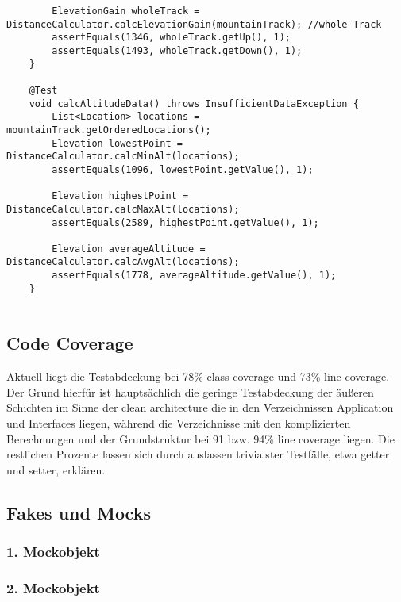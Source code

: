 \begin{lstlisting}
        ElevationGain wholeTrack = DistanceCalculator.calcElevationGain(mountainTrack); //whole Track
        assertEquals(1346, wholeTrack.getUp(), 1);
        assertEquals(1493, wholeTrack.getDown(), 1);
    }

    @Test
    void calcAltitudeData() throws InsufficientDataException {
        List<Location> locations = mountainTrack.getOrderedLocations();
        Elevation lowestPoint = DistanceCalculator.calcMinAlt(locations);
        assertEquals(1096, lowestPoint.getValue(), 1);

        Elevation highestPoint = DistanceCalculator.calcMaxAlt(locations);
        assertEquals(2589, highestPoint.getValue(), 1);

        Elevation averageAltitude = DistanceCalculator.calcAvgAlt(locations);
        assertEquals(1778, averageAltitude.getValue(), 1);
    }
    
\end{lstlisting}

\subsection{Code Coverage}
Aktuell liegt die Testabdeckung bei 78\% class coverage und 73\% line coverage. Der Grund hierfür ist hauptsächlich die geringe Testabdeckung der äußeren Schichten im Sinne der clean architecture die in den Verzeichnissen Application und Interfaces liegen, während die Verzeichnisse mit den komplizierten Berechnungen und der Grundstruktur bei 91 bzw. 94\% line coverage liegen. Die restlichen Prozente lassen sich durch auslassen trivialster Testfälle, etwa getter und setter, erklären.

\subsection{Fakes und Mocks}
 
 \subsubsection{1. Mockobjekt}
 
 \subsubsection{2. Mockobjekt}
